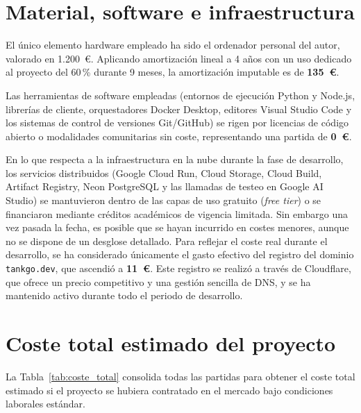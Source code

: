 \section{Material, software e infraestructura}

El único elemento hardware empleado ha sido el ordenador personal del autor, valorado en
1.200~€. Aplicando amortización lineal a 4 años con un uso dedicado al proyecto del 60\,\%
durante 9 meses, la amortización imputable es de \textbf{135~€}.

Las herramientas de software empleadas (entornos de ejecución Python y Node.js, librerías de cliente,
orquestadores Docker Desktop, editores Visual Studio Code y los sistemas de control de versiones Git/GitHub)
se rigen por licencias de código abierto o modalidades comunitarias sin coste, representando una partida de \textbf{0~€}.

En lo que respecta a la infraestructura en la nube durante la fase de desarrollo, los servicios distribuidos
(Google Cloud Run, Cloud Storage, Cloud Build, Artifact Registry, Neon PostgreSQL y las llamadas de testeo en Google AI Studio)
se mantuvieron dentro de las capas de uso gratuito (\textit{free tier}) o se financiaron mediante créditos académicos de vigencia limitada. Sin embargo una vez pasada la fecha,
es posible que se hayan incurrido en costes menores, aunque no se dispone de un desglose detallado. Para reflejar el coste real durante el desarrollo,
se ha considerado únicamente el gasto efectivo del registro del dominio \texttt{tankgo.dev}, que ascendió a \textbf{11~€}. Este registro se realizó a través de Cloudflare,
que ofrece un precio competitivo y una gestión sencilla de DNS, y se ha mantenido activo durante todo el periodo de desarrollo.

\section{Coste total estimado del proyecto}

La Tabla~\ref{tab:coste_total} consolida todas las partidas para obtener el coste total
estimado si el proyecto se hubiera contratado en el mercado bajo condiciones laborales estándar.

